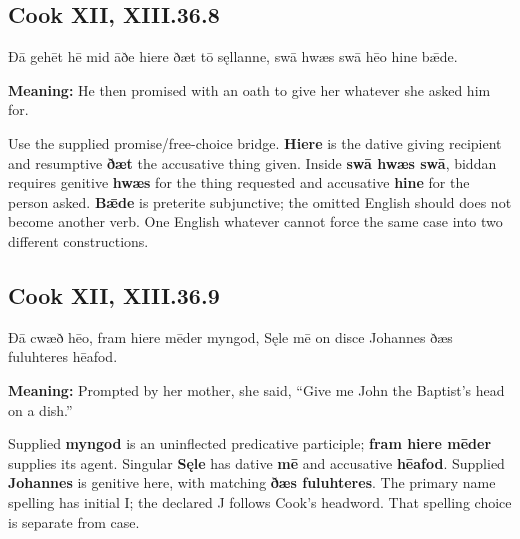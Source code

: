 \par\begin{minipage}{\linewidth}\raggedright
\subsection*{Cook XII, XIII.36.8}

Ðā gehēt hē mid āðe hiere ðæt tō sęllanne, swā hwæs swā hēo hine bǣde.

\textbf{Meaning:} He then promised with an oath to give her whatever she asked him for.

Use the supplied promise/\allowbreak{}free-choice bridge. \textbf{Hiere} is the dative giving recipient and resumptive \textbf{ðæt} the accusative thing given. Inside \textbf{swā hwæs swā}, biddan requires genitive \textbf{hwæs} for the thing requested and accusative \textbf{hine} for the person asked. \textbf{Bǣde} is preterite subjunctive; the omitted English should does not become another verb. One English whatever cannot force the same case into two different constructions.

\end{minipage}\par\addvspace{4pt}

\par\begin{minipage}{\linewidth}\raggedright
\subsection*{Cook XII, XIII.36.9}

Ðā cwæð hēo, fram hiere mēder myngod, Sęle mē on disce Johannes ðæs fuluhteres hēafod.

\textbf{Meaning:} Prompted by her mother, she said, “Give me John the Baptist’s head on a dish.”

Supplied \textbf{myngod} is an uninflected predicative participle; \textbf{fram hiere mēder} supplies its agent. Singular \textbf{Sęle} has dative \textbf{mē} and accusative \textbf{hēafod}. Supplied \textbf{Johannes} is genitive here, with matching \textbf{ðæs fuluhteres}. The primary name spelling has initial I; the declared J follows Cook’s headword. That spelling choice is separate from case.

\end{minipage}\par\addvspace{4pt}

